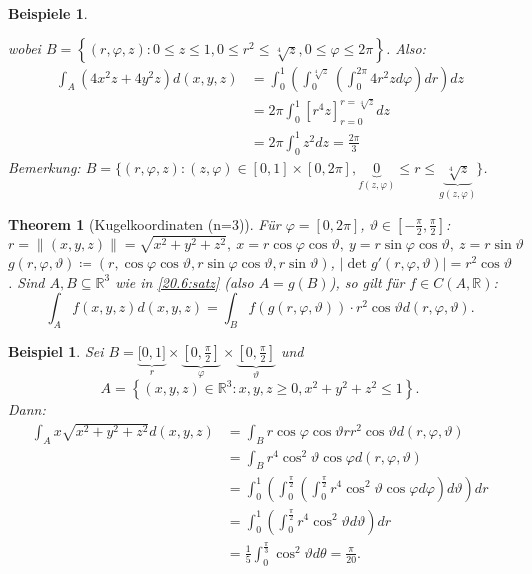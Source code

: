 \documentclass[12pt]{extreport} %
\newcommand{\R}{\mathbb{R}}
\theoremstyle{named}
\newtheorem{unnamedtheorem}{Theorem} \counterwithin{unnamedtheorem}{chapter}
\theoremstyle{nnamed}
\theoremstyle{itshape}
\theoremstyle{normal}
\newtheorem*{beispiel*}{Beispiel}
\newtheorem*{beispiele}{Beispiele}
\begin{document}
\begin{beispiele}
\begin{enumerate}
			wobei $B = \left\{ (r, \varphi, z) \colon 0 \leq z \leq 1, 0 \leq r^{2} \leq \sqrt[4]{z},0 \leq \varphi \leq 2\pi  \right\}$. Also:
			\begin{align*}
				\int_{A} \left( 4x^{2} z + 4 y^{2} z \right) d(x,y,z) & = \int_{0}^{1} \left( \int_{0}^{\sqrt[4]{z}}  \left( \int_{0}^{2\pi} 4 r^{2} z d\varphi \right) dr \right) dz \\
				& = 2\pi \int_{0}^{1} \left[ r^{4} z \right]_{r=0}^{r=\sqrt[4]{z}} dz \\
				& = 2\pi \int_{0}^{1} z^{2} dz = \frac{2\pi}{3} 
			\end{align*} 
			Bemerkung: $B = \big\{ (r,\varphi, z) \colon (z, \varphi) \in [0,1] \times [0, 2\pi], \underbrace{0}_{f(z,\varphi)} \leq r \leq \underbrace{\sqrt[4]{z}}_{g(z,\varphi)} \big\}$. %
	\end{enumerate}
\end{beispiele}


\begin{unnamedtheorem}[Kugelkoordinaten (n=3)] \label{20.10:satz}
	Für $\varphi = [0, 2\pi]$, $\vartheta \in \left[-\frac{\pi}{2}, \frac{\pi}{2} \right]$:
	$$ r = \|(x,y,z)\| = \sqrt{x^{2} + y^{2} + z^{2}}, ~ x = r \cos \varphi \cos \vartheta, ~ y = r \sin \varphi \cos \vartheta, ~ z = r \sin \vartheta $$
	$g(r, \varphi, \vartheta) \coloneqq (r, \cos \varphi \cos \vartheta, r \sin \varphi \cos \vartheta, r \sin \vartheta)$, $|\det g'(r, \varphi, \vartheta)| = r^{2} \cos \vartheta$. Sind $A, B \subseteq \R^{3}$ wie in \ref{20.6:satz} (also $A = g(B)$), so gilt für $f \in C(A, \R)$:
	$$ \int_{A} f(x,y,z) d(x,y,z) = \int_{B} f(g(r,\varphi, \vartheta)) \cdot r^{2} \cos \vartheta d(r, \varphi, \vartheta). $$
\end{unnamedtheorem}


\begin{beispiel*}
	Sei $B = \underbrace{\Big[0, 1\Big]}_{r} \times \underbrace{\left[ 0, \frac{\pi}{2}\right]}_{\varphi} \times \underbrace{\left[ 0, \frac{\pi}{2} \right]}_{\vartheta}$ und  
	$$A = \left\{ (x,y,z) \in \R^{3} \colon x,y,z \geq 0, x^{2} + y^{2} + z^{2} \leq 1 \right\}. $$ 
	Dann:
	\begin{align*}
		\int_{A} x \sqrt{x^{2} + y^{2} + z^{2}} d(x,y,z) & = \int_{B} r \cos \varphi \cos \vartheta r r^{2} \cos \vartheta d(r,\varphi, \vartheta) \\
			& = \int_{B} r^{4} \cos^{2} \vartheta \cos \varphi d(r,\varphi, \vartheta) \\
			& = \int_{0}^{1} \left( \int_{0}^{\frac{\pi}{2}} \left( \int_{0}^{\frac{\pi}{2}} r^{4} \cos^{2} \vartheta \cos \varphi d\varphi \right) d \vartheta \right) d r \\
			& = \int_{0}^{1} \left( \int_{0}^{\frac{\pi}{2}} r^{4} \cos^{2} \vartheta d\vartheta \right) dr \\
			& = \frac{1}{5} \int_{0}^{\frac{\pi}{3}} \cos^{2} \vartheta d\theta = \frac{\pi}{20}.
	\end{align*}
\end{beispiel*}
\end{document}
